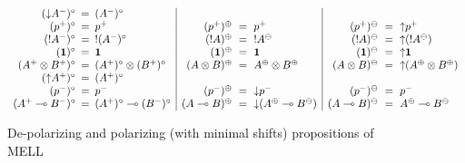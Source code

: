 \begin{figure}
{\small \[
\begin{array}{rcl|rcl|rcl}
({\downarrow}A^-)^\circ & \!\!\!=\!\!\! & (A^-)^\circ & & & & & & 
\\
(p^+)^\circ & \!\!\!=\!\!\! & p^+ &
(p^+)^\oplus & \!\!\!=\!\!\! & p^+ &
(p^+)^\ominus & \!\!\!=\!\!\! & {\uparrow}p^+
\\
({!}A^-)^\circ & \!\!\!=\!\!\! & {!}(A^-)^\circ &
({!}A)^\oplus & \!\!\!=\!\!\! & {!}A^\ominus &
({!}A)^\ominus & \!\!\!=\!\!\! & {\uparrow}({!}A^\ominus)
\\
(\one)^\circ & \!\!\!=\!\!\! & \one &
(\one)^\oplus & \!\!\!=\!\!\! & \one &
(\one)^\ominus & \!\!\!=\!\!\! & {\uparrow}\one 
\\
(A^+ \otimes B^+)^\circ & \!\!\!=\!\!\! & (A^+)^\circ \otimes (B^+)^\circ &
(A \otimes B)^\oplus & \!\!\!=\!\!\! & A^\oplus \otimes B^\oplus &
(A \otimes B)^\ominus & \!\!\!=\!\!\! & {\uparrow}(A^\oplus \otimes B^\oplus)
\\
({\uparrow}A^+)^\circ & \!\!\!=\!\!\! & (A^+)^\circ & & & & & & 
\\
(p^-)^\circ & \!\!\!=\!\!\! & p^- &
(p^-)^\oplus & \!\!\!=\!\!\! & {\downarrow}p^- &
(p^-)^\ominus & \!\!\!=\!\!\! & p^- 
\\
(A^+ \lolli B^-)^\circ & \!\!\!=\!\!\! & (A^+)^\circ \lolli (B^-)^\circ &
(A \lolli B)^\oplus & \!\!\!=\!\!\! & {\downarrow}(A^\oplus \lolli B^\ominus) &
(A \lolli B)^\ominus & \!\!\!=\!\!\! & A^\oplus \lolli B^\ominus
\end{array}
\]}

\caption{De-polarizing and polarizing (with minimal shifts) propositions of MELL}
\label{fig:lin-shift}
\end{figure}
